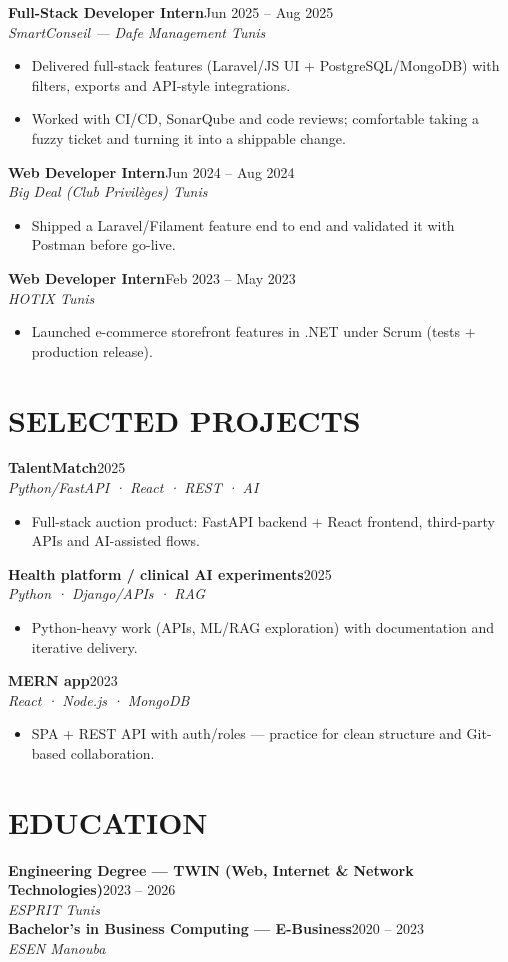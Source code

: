 \documentclass[10pt,a4paper]{article}
\newcommand{\job}[3]{%
  \textbf{\color{primary}#1}\hfill{\color{muted}\small #2}\\[-1pt]
  {\color{accent}\textit{#3}}\\[2pt]
  \begin{itemize}[leftmargin=0.85em, itemsep=1pt, topsep=0pt, parsep=0pt, partopsep=0pt]
}
\newcommand{\proj}[3]{%
  \textbf{\color{primary}#1}\hfill{\color{muted}\small #2}\\[-1pt]
  {\color{accent}\textit{#3}}\\[1pt]
  \begin{itemize}[leftmargin=0.85em, itemsep=1pt, topsep=0pt, parsep=0pt, partopsep=0pt]
}
\newcommand{\edu}[3]{%
  \textbf{\color{primary}#1}\hfill{\color{muted}\small #2}\\[-1pt]
  {\color{accent}\textit{#3}}\\[3pt]
}
\begin{document}
\job{Full-Stack Developer Intern}{Jun 2025 -- Aug 2025}{SmartConseil --- Dafe Management \textbar{} Tunis}
  \item Delivered full-stack features (Laravel/JS UI + PostgreSQL/MongoDB) with filters, exports and API-style integrations.
  \item Worked with CI/CD, SonarQube and code reviews; comfortable taking a fuzzy ticket and turning it into a shippable change.
\end{itemize}

\job{Web Developer Intern}{Jun 2024 -- Aug 2024}{Big Deal (Club Privilèges) \textbar{} Tunis}
  \item Shipped a Laravel/Filament feature end to end and validated it with Postman before go-live.
\end{itemize}

\job{Web Developer Intern}{Feb 2023 -- May 2023}{HOTIX \textbar{} Tunis}
  \item Launched e-commerce storefront features in .NET under Scrum (tests + production release).
\end{itemize}

\section{SELECTED PROJECTS}
{\footnotesize
\setlength{\parskip}{1pt}
\proj{TalentMatch}{2025}{Python/FastAPI · React · REST · AI}
  \item Full-stack auction product: FastAPI backend + React frontend, third-party APIs and AI-assisted flows.
\end{itemize}
\proj{Health platform / clinical AI experiments}{2025}{Python · Django/APIs · RAG}
  \item Python-heavy work (APIs, ML/RAG exploration) with documentation and iterative delivery.
\end{itemize}
\proj{MERN app}{2023}{React · Node.js · MongoDB}
  \item SPA + REST API with auth/roles --- practice for clean structure and Git-based collaboration.
\end{itemize}
}

\section{EDUCATION}
\edu{Engineering Degree --- TWIN (Web, Internet \& Network Technologies)}{2023 -- 2026}{ESPRIT \textbar{} Tunis}
\edu{Bachelor's in Business Computing --- E-Business}{2020 -- 2023}{ESEN \textbar{} Manouba}
\end{document}
